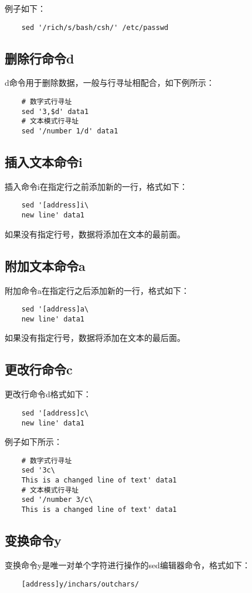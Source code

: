 \documentclass[a4paper,left=2.5cm,right=2.5cm,11pt]{article}
\begin{document}
	例子如下：
	\begin{lstlisting}
	sed '/rich/s/bash/csh/' /etc/passwd
	\end{lstlisting}

\subsection{删除行命令d}
	d命令用于删除数据，一般与行寻址相配合，如下例所示：
	\begin{lstlisting}
	# 数字式行寻址
	sed '3,$d' data1
	# 文本模式行寻址
	sed '/number 1/d' data1
	\end{lstlisting}

\subsection{插入文本命令i}
	插入命令i在指定行之前添加新的一行，格式如下：
	\begin{lstlisting}
	sed '[address]i\
	new line' data1
	\end{lstlisting}

	如果没有指定行号，数据将添加在文本的最前面。

\subsection{附加文本命令a}
	附加命令a在指定行之后添加新的一行，格式如下：
	\begin{lstlisting}
	sed '[address]a\
	new line' data1
	\end{lstlisting}

	如果没有指定行号，数据将添加在文本的最后面。

\subsection{更改行命令c}
	更改行命令d格式如下：
	\begin{lstlisting}
	sed '[address]c\
	new line' data1
	\end{lstlisting}

	例子如下所示：
	\begin{lstlisting}
	# 数字式行寻址
	sed '3c\
	This is a changed line of text' data1
	# 文本模式行寻址
	sed '/number 3/c\
	This is a changed line of text' data1
	\end{lstlisting}

\subsection{变换命令y}
	变换命令y是唯一对单个字符进行操作的sed编辑器命令，格式如下：
	\begin{lstlisting}
	[address]y/inchars/outchars/
	\end{lstlisting}
\end{document}
